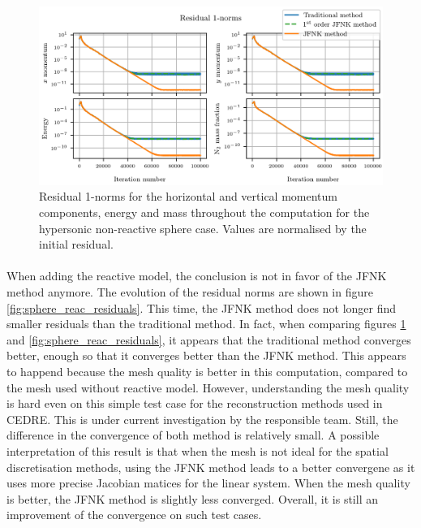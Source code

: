         \begin{figure}
          \includegraphics{figures/sphere_residuals.png}
          \caption{Residual 1-norms for the horizontal and vertical momentum components, energy and  mass throughout the computation for the hypersonic non-reactive sphere case.
          Values are normalised by the initial residual.}
          \label{fig:sphere_residuals}
        \end{figure}

        \paragraph{}
        When adding the reactive model, the conclusion is not in favor of the JFNK method anymore.
        The evolution of the residual norms are shown in figure \ref{fig:sphere_reac_residuals}.
        This time, the JFNK method does not longer find smaller residuals than the traditional method.
        In fact, when comparing figures \ref{fig:sphere_residuals} and \ref{fig:sphere_reac_residuals}, it appears that the traditional method converges better, enough so that it converges better than the JFNK method.
        This appears to happend because the mesh quality is better in this computation, compared to the mesh used without reactive model.
        However, understanding the mesh quality is hard even on this simple test case for the reconstruction methods used in CEDRE.
        This is under current investigation by the responsible team.
        Still, the difference in the convergence of both method is relatively small.
        A possible interpretation of this result is that when the mesh is not ideal for the spatial discretisation methods, using the JFNK method leads to a better convergene as it uses more precise Jacobian matices for the linear system.
        When the mesh quality is better, the JFNK method is slightly less converged.
        Overall, it is still an improvement of the convergence on such test cases.

